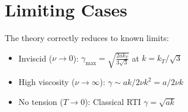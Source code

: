 \documentclass[aps,pre,twocolumn,showpacs,superscriptaddress]{revtex4-2}
\theoremstyle{definition}
\begin{document}
\section{Limiting Cases}

The theory correctly reduces to known limits:
\begin{itemize}
\item Inviscid ($\nu \to 0$): $\gamma_{\max} = \sqrt{\frac{2ak_T}{3\sqrt{3}}}$ at $k = k_T/\sqrt{3}$
\item High viscosity ($\nu \to \infty$): $\gamma \sim ak/2\nu k^2 = a/2\nu k$
\item No tension ($T \to 0$): Classical RTI $\gamma = \sqrt{ak}$
\end{itemize}


\end{document}
